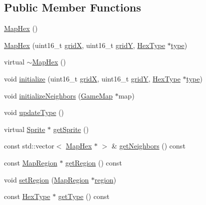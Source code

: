\subsection*{Public Member Functions}
\begin{DoxyCompactItemize}
\item 
\hyperlink{class_map_hex_a9fc6f3220be1d449d10011eb1092043b}{Map\+Hex} ()
\item 
\hyperlink{class_map_hex_afdb8d14d89ae9bdd45f74b063ec55f1f}{Map\+Hex} (uint16\+\_\+t \hyperlink{class_map_object_a48d8e19188fd7ae1b74d2de47d546209}{gridX}, uint16\+\_\+t \hyperlink{class_map_object_a0d3a76d4816097941bbfb5208b81cab6}{gridY}, \hyperlink{class_hex_type}{Hex\+Type} $\ast$\hyperlink{class_map_hex_acdc5f2afda9662cee5cd861d2ea98111}{type})
\item 
virtual \hyperlink{class_map_hex_a95541178e4dabb2cafe2f2e12579815b}{$\sim$\+Map\+Hex} ()
\item 
void \hyperlink{class_map_hex_a325e5009a0b83dfda7cc97fa3b3f9599}{initialize} (uint16\+\_\+t \hyperlink{class_map_object_a48d8e19188fd7ae1b74d2de47d546209}{gridX}, uint16\+\_\+t \hyperlink{class_map_object_a0d3a76d4816097941bbfb5208b81cab6}{gridY}, \hyperlink{class_hex_type}{Hex\+Type} $\ast$\hyperlink{class_map_hex_acdc5f2afda9662cee5cd861d2ea98111}{type})
\item 
void \hyperlink{class_map_hex_a325a38d569568972bf2503056609f283}{initialize\+Neighbors} (\hyperlink{class_game_map}{Game\+Map} $\ast$map)
\item 
void \hyperlink{class_map_hex_a61e3572ebecb6f3c2c13c127142fd607}{update\+Type} ()
\item 
virtual \hyperlink{class_sprite}{Sprite} $\ast$ \hyperlink{class_map_hex_ac4ff66c1341e7b572fd90e8f0117ec68}{get\+Sprite} ()
\item 
const std\+::vector$<$ \hyperlink{class_map_hex}{Map\+Hex} $\ast$ $>$ \& \hyperlink{class_map_hex_a59e8590a536b9e25c22ca6159e6e5243}{get\+Neighbors} () const
\item 
const \hyperlink{class_map_region}{Map\+Region} $\ast$ \hyperlink{class_map_hex_a0132642caf49e702635e990b1dc88bbf}{get\+Region} () const
\item 
void \hyperlink{class_map_hex_a16e97b71ca65b0f74f7c0c343e2c2e0a}{set\+Region} (\hyperlink{class_map_region}{Map\+Region} $\ast$\hyperlink{class_map_hex_a717a676e9a80b8e476dc4b75c45c7645}{region})
\item 
const \hyperlink{class_hex_type}{Hex\+Type} $\ast$ \hyperlink{class_map_hex_af29bc51cd2e5bfeebd655167a2309f0d}{get\+Type} () const
\end{DoxyCompactItemize}
